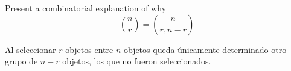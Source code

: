 \item Present a combinatorial explanation of why
\[ \binom{n}{r} = \binom{n}{r, n-r} \]

Al seleccionar $r$ objetos entre $n$ objetos queda únicamente determinado otro grupo de $n-r$ objetos, los que no fueron seleccionados.